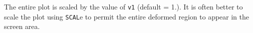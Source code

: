 \headb

The entire plot is scaled by the value of {\tt v1} (default = 1.).
It is often better to scale the plot using {\tt SCAL}e to
permit the entire deformed region to appear in the screen area.
\vfill
\eject
